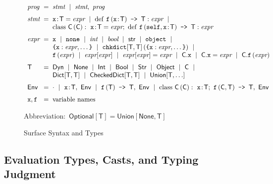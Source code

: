 \documentclass[english,cleveref,submission]{programming}
\makeatletter
\newcommand{\code}[1]{\texttt{#1}}
\newcommand{\defeq}{=}
\newcommand{\langmid}{~\mid~} %
\newenvironment{langarray}{\(\begin{array}{l@{\hspace{2mm}}c@{\hspace{2mm}}l}}{\end{array}\)}
\newcommand{\spapp}[2]{#1\,(#2)}
\newcommand{\spann}[2]{#1\!:\!#2}
\newcommand{\typefont}[1]{\mathsf{#1}}
\newcommand{\codefont}[1]{\emph{#1}}
\newcommand{\paramtype}[2]{#1[#2]}
\newcommand{\sptype}{\typefont{T}}
\newcommand{\sptclass}{\typefont{C}}
\newcommand{\sptint}{\typefont{Int}}
\newcommand{\sptstr}{\typefont{Str}}
\newcommand{\sptbool}{\typefont{Bool}}
\newcommand{\sptdyn}{\typefont{Dyn}}
\newcommand{\sptobject}{\typefont{Object}}
\newcommand{\sptnone}{\typefont{None}}
\newcommand{\sptoptional}[1]{\paramtype{\typefont{Optional}}{#1}}
\newcommand{\sptunion}[1]{\paramtype{\typefont{Union}}{#1}}
\newcommand{\sptrawpydict}{\typefont{Dict}}
\newcommand{\sptrawchkdict}{\typefont{CheckedDict}} %
\newcommand{\sptpydict}[2]{\paramtype{\sptrawpydict}{#1, #2}}
\newcommand{\sptchkdict}[2]{\paramtype{\sptrawchkdict}{#1, #2}}
\newcommand{\sptenv}{\typefont{Env}}
\newcommand{\sptenvnil}{\cdot}
\newcommand{\sptvardef}[2]{\spann{#1}{#2}}
\newcommand{\sptfundef}[3]{\spapp{#1}{#2}\code{ -> }#3}
\newcommand{\sptclassdef}[4]{\mathrm{class}~\spapp{#1}{#2}:~#3;~#4}
\newcommand{\spx}{\code{x}}
\newcommand{\spf}{\code{f}}
\newcommand{\spc}{\sptclass}
\newcommand{\spprog}{\codefont{prog}}
\newcommand{\spstmt}{\codefont{stmt}}
\newcommand{\spexpr}{\codefont{expr}}
\newcommand{\spvardef}[3]{\sptvardef{#1}{#2} = #3}
\newcommand{\spfundef}[4]{\mathrm{def}~\spapp{#1}{#2}\code{ -> }#3: #4}
\newcommand{\spclassdef}[4]{\mathrm{class}~\spapp{#1}{#2}:~#3;~#4}
\newcommand{\spself}{\code{self}}
\newcommand{\spobject}{\code{object}}
\newcommand{\spnone}{\code{none}}
\newcommand{\spint}{\codefont{int}}
\newcommand{\spbool}{\codefont{bool}}
\newcommand{\spstr}{\typefont{str}}
\newcommand{\sppydict}[1]{\code{\{}#1\code{\}}}
\newcommand{\spchkdict}[3]{\spapp{\paramtype{\code{chkdict}}{#1, #2}}{#3}}
\newcommand{\spdictref}[2]{#1[#2]}
\newcommand{\spdictset}[3]{\spdictref{#1}{#2} = #3}
\newcommand{\spobjref}[2]{#1.#2}
\newcommand{\spobjset}[3]{\spobjref{#1}{#2} = #3}
\newcommand{\spobjapp}[3]{\spobjref{#1}{\spapp{#2}{#3}}}
\makeatother
\begin{document}
\begin{figure}[t]
  \begin{langarray}
    \spprog & \defeq &
      \spstmt \langmid \spstmt,~\spprog
    \\[1.5ex]
    \spstmt & \defeq &
      \spvardef{\spx}{\sptype}{\spexpr} \langmid
      \spfundef{\spf}{\spann{\spx}{\sptype}}{\sptype}{\spexpr} \langmid
  \\ & &
      \spclassdef{\spc}{\spc}{\spvardef{\spx}{\sptype}{\spexpr}}{\spfundef{\spf}{\spself, \spann{\spx}{\sptype}}{\sptype}{\spexpr}}
    \\[1.5ex]
    \spexpr & \defeq &
      \spx \langmid \spnone \langmid \spint \langmid \spbool \langmid \spstr \langmid \spobject \langmid
  \\ & &
      \sppydict{\spx: \spexpr, \ldots} \langmid
      \spchkdict{\sptype}{\sptype}{\sppydict{\spx: \spexpr, \ldots}} \langmid
  \\ & &
      \spapp{\spf}{\spexpr} \langmid
      \spdictref{\spexpr}{\spexpr} \langmid
      \spdictset{\spexpr}{\spexpr}{\spexpr} \langmid
      \spobjref{\spc}{\spx} \langmid
      \spobjset{\spc}{\spx}{\spexpr} \langmid
      \spobjapp{\spc}{\spf}{\spexpr}
    \\[1.5ex]
    \sptype & \defeq &
      \sptdyn \langmid
      \sptnone \langmid
      \sptint \langmid
      \sptbool \langmid
      \sptstr \langmid
      \sptobject \langmid
      \sptclass \langmid
  \\ & &
      \sptpydict{\sptype}{\sptype} \langmid
      \sptchkdict{\sptype}{\sptype} \langmid
      \sptunion{\sptype, \ldots}
    \\[1.5ex]
    \sptenv & \defeq &
      \sptenvnil \langmid
      \sptvardef{\spx}{\sptype},~\sptenv \langmid
      \sptfundef{\spf}{\sptype}{\sptype},~\sptenv \langmid
      \sptclassdef{\spc}{\spc}{\sptvardef{\spx}{\sptype}}{\sptfundef{\spf}{\sptclass, \sptype}{\sptype}},~\sptenv
    \\[1.5ex]
    \spx, \spf & \defeq & \mbox{variable names}
  \end{langarray}

  \bigskip
  \mbox{Abbreviation: $\sptoptional{\sptype} \defeq \sptunion{\sptnone, \sptype}$}

  \caption{Surface Syntax and Types}
  \label{f:surface-types}
\end{figure}


\subsection{Evaluation Types, Casts, and Typing Judgment}
\label{s:eval-types}
\end{document}
